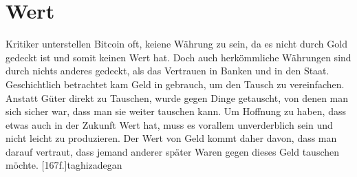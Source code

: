 \section{Wert}

Kritiker unterstellen Bitcoin oft, keiene Währung zu sein, da es nicht durch Gold gedeckt ist und somit keinen Wert hat.
Doch auch herkömmliche Währungen sind durch nichts anderes gedeckt, als das Vertrauen in Banken und in den Staat. 
Geschichtlich betrachtet kam Geld in gebrauch, um den Tausch zu vereinfachen.
Anstatt Güter direkt zu Tauschen, wurde gegen Dinge getauscht, von denen man sich sicher war, dass man sie weiter tauschen kann.
Um Hoffnung zu haben, dass etwas auch in der Zukunft Wert hat, muss es vorallem unverderblich sein und nicht leicht zu produzieren.
Der Wert von Geld kommt daher davon, dass man darauf vertraut, dass jemand anderer später Waren gegen dieses Geld tauschen möchte. [167f.]{taghizadegan}
